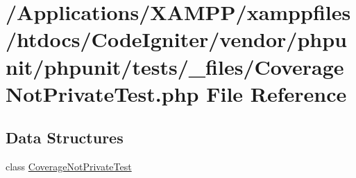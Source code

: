\hypertarget{phpunit_2tests_2__files_2_coverage_not_private_test_8php}{}\section{/\+Applications/\+X\+A\+M\+P\+P/xamppfiles/htdocs/\+Code\+Igniter/vendor/phpunit/phpunit/tests/\+\_\+files/\+Coverage\+Not\+Private\+Test.php File Reference}
\label{phpunit_2tests_2__files_2_coverage_not_private_test_8php}
\subsection*{Data Structures}
\begin{DoxyCompactItemize}
\item 
class \mbox{\hyperlink{class_coverage_not_private_test}{Coverage\+Not\+Private\+Test}}
\end{DoxyCompactItemize}
